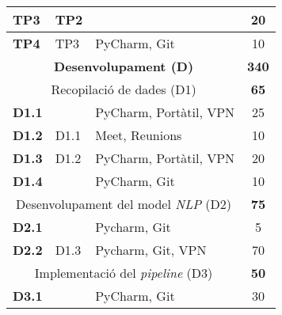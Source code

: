 {{\begin{table}[H]
\begin{tabular}{|cllc|}
    \multicolumn{1}{|l|}{\textbf{TP3}}          & \multicolumn{1}{l|}{TP2}                      & \multicolumn{1}{l|}{}               & 20                       \\ \hline
    \multicolumn{1}{|l|}{\textbf{TP4}}          & \multicolumn{1}{l|}{TP3}                      & \multicolumn{1}{l|}{PyCharm, Git}   & 10                       \\ \hline
    \hline
    \multicolumn{3}{|c|}{\textbf{Desenvolupament (D)}}                                  & \textbf{340}             \\ \hline
                                                \multicolumn{3}{|c|}{Recopilació de dades (D1)}                                     & \textbf{65}              \\ \hline
    \multicolumn{1}{|l|}{\textbf{D1.1}}         & \multicolumn{1}{l|}{}                      & \multicolumn{1}{l|}{PyCharm, Portàtil, VPN} & 25                       \\ \hline
    \multicolumn{1}{|l|}{\textbf{D1.2}}         & \multicolumn{1}{l|}{D1.1}                      & \multicolumn{1}{l|}{Meet, Reunions}    & 10                       \\ \hline
    \multicolumn{1}{|l|}{\textbf{D1.3}}         & \multicolumn{1}{l|}{D1.2}                      & \multicolumn{1}{l|}{PyCharm, Portàtil, VPN}    & 20                       \\ \hline
    \multicolumn{1}{|l|}{\textbf{D1.4}}         & \multicolumn{1}{l|}{}                      & \multicolumn{1}{l|}{PyCharm, Git}    & 10                       \\ \hline
                                                \multicolumn{3}{|c|}{Desenvolupament del model \textit{NLP} (D2)}                            & \textbf{75}              \\ \hline
    \multicolumn{1}{|l|}{\textbf{D2.1}}         & \multicolumn{1}{l|}{}                      & \multicolumn{1}{l|}{Pycharm, Git}   & 5                        \\ \hline
    \multicolumn{1}{|l|}{\textbf{D2.2}}         & \multicolumn{1}{l|}{D1.3}                      & \multicolumn{1}{l|}{Pycharm, Git, VPN} & 70                       \\ \hline
                                                \multicolumn{3}{|c|}{Implementació del \textit{pipeline} (D3)}         & \textbf{50}              \\ \hline
    \multicolumn{1}{|l|}{\textbf{D3.1}}         & \multicolumn{1}{l|}{}                      & \multicolumn{1}{l|}{PyCharm, Git}              & 30                       \\ \hline

\end{tabular}
\end{table}}}
